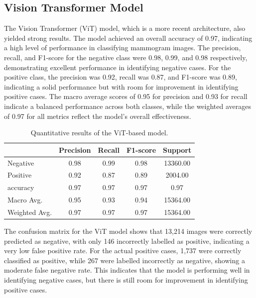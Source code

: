 \documentclass[../main]{subfiles}
\begin{document}
\subsection{Vision Transformer Model}
The Vision Transformer (ViT) model, which is a more recent architecture, also yielded strong results. The model achieved an overall accuracy of 0.97, indicating a high level of performance in classifying mammogram images. The precision, recall, and F1-score for the negative class were 0.98, 0.99, and 0.98 respectively, demonstrating excellent performance in identifying negative cases. For the positive class, the precision was 0.92, recall was 0.87, and F1-score was 0.89, indicating a solid performance but with room for improvement in identifying positive cases. The macro average scores of 0.95 for precision and 0.93 for recall indicate a balanced performance across both classes, while the weighted averages of 0.97 for all metrics reflect the model's overall effectiveness.

\begin{table}[h!]
    \centering
    \begin{tabular}{|l|c|c|c|c|}
        \hline
         & Precision & Recall & F1-score & Support \\ \hline
        Negative & 0.98 & 0.99 & 0.98 & 13360.00 \\ \hline
        Positive & 0.92 & 0.87 & 0.89 & 2004.00 \\ \hline
        accuracy & 0.97 & 0.97 & 0.97 & 0.97 \\ \hline
        Macro Avg. & 0.95 & 0.93 & 0.94 & 15364.00 \\ \hline
        Weighted Avg. & 0.97 & 0.97 & 0.97 & 15364.00 \\ \hline
    \end{tabular}
    \caption{Quantitative results of the ViT-based model.}
    \label{tab:quantitative-results-vit}
\end{table}

\noindent The confusion matrix for the ViT model shows that 13,214 images were correctly predicted as negative, with only 146 incorrectly labelled as positive, indicating a very low false positive rate. For the actual positive cases, 1,737 were correctly classified as positive, while 267 were labelled incorrectly as negative, showing a moderate false negative rate. This indicates that the model is performing well in identifying negative cases, but there is still room for improvement in identifying positive cases.
\end{document}
